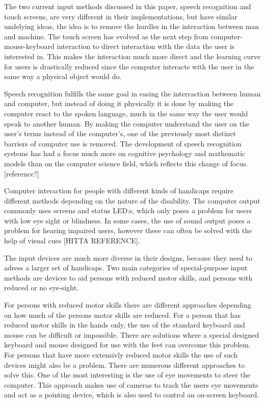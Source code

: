
The two current input methods discussed in this paper, speech recognition and touch screens, are very different in their implementations, but have similar undelying ideas, the idea is to remove the hurdles in the interaction between man and machine. The touch screen has evolved as the next step from computer-mouse-keyboard interaction to direct interaction with the data the user is interested in. This makes the interaction much more direct and the learning curve for users is drastically reduced since the computer interacts with the user in the same way a physical object would do.

Speech recognition fulfills the same goal in easing the interraction between human and computer, but instead of doing it physically it is done by making the computer react to the spoken language, much in the same way the user would speak to another human. By making the computer understand the user on the user's terms instead of the computer's, one of the previously most distinct barriers of computer use is removed. The development of speech recognition systems has had a focus much more on cognitive psychology and mathematic models than on the computer science field, which reflects this change of focus.[reference?]


Computer interaction for people with different kinds of handicaps require different methods depending on the nature of the disability. The computer output commonly uses screens and status LED:s, which only poses a problem for users with low eye sight or blindness. In some cases, the use of sound output poses a problem for hearing impaired users, however these can often be solved with the help of visual cues [HITTA REFERENCE]. 

The input devices are much more diverse in their designs, because they need to adress a larger set of handicaps. Two main categories of special-purpose input methods are devices to aid persons with reduced motor skills, and persons with reduced or no eye-sight.

For persons with reduced motor skills there are different approaches depending on how much of the persons motor skills are reduced. For a person that has reduced motor skills in the hands only, the use of the standard keyboard and mouse can be difficult or impossible. There are solutions where a special designed keyboard and mouse designed for use with the feet can overcome this problem.
For persons that have more extensivly reduced motor skills the use of such devices might also be a problem. There are numerous different approaches to solve this. One of the most interesting is the use of eye movements to steer the computer. This approach makes use of cameras to track the users eye movements and act as a pointing device, which is also used to control an on-screen keyboard. 

